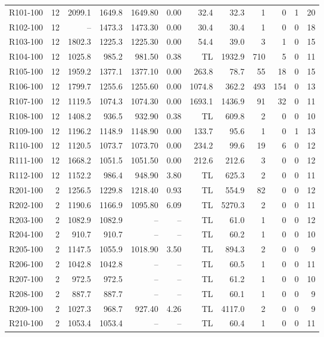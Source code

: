 \documentclass[10pt]{article}
\begin{document}
\begin{table}[p]
\begin{tabular}{lrrrrrrrrrrr}
\midrule
R101-100 & 12 & 2099.1 & 1649.8 & 1649.80 & 0.00 & 32.4 & 32.3 & 1 & 0 & 1 & 20 \\
R102-100 & 12 & -- & 1473.3 & 1473.30 & 0.00 & 30.4 & 30.4 & 1 & 0 & 0 & 18 \\
R103-100 & 12 & 1802.3 & 1225.3 & 1225.30 & 0.00 & 54.4 & 39.0 & 3 & 1 & 0 & 15 \\
R104-100 & 12 & 1025.8 & 985.2 & 981.50 & 0.38 & TL & 1932.9 & 710 & 5 & 0 & 11 \\
R105-100 & 12 & 1959.2 & 1377.1 & 1377.10 & 0.00 & 263.8 & 78.7 & 55 & 18 & 0 & 15 \\
R106-100 & 12 & 1799.7 & 1255.6 & 1255.60 & 0.00 & 1074.8 & 362.2 & 493 & 154 & 0 & 13 \\
R107-100 & 12 & 1119.5 & 1074.3 & 1074.30 & 0.00 & 1693.1 & 1436.9 & 91 & 32 & 0 & 11 \\
R108-100 & 12 & 1408.2 & 936.5 & 932.90 & 0.38 & TL & 609.8 & 2 & 0 & 0 & 10 \\
R109-100 & 12 & 1196.2 & 1148.9 & 1148.90 & 0.00 & 133.7 & 95.6 & 1 & 0 & 1 & 13 \\
R110-100 & 12 & 1120.5 & 1073.7 & 1073.70 & 0.00 & 234.2 & 99.6 & 19 & 6 & 0 & 12 \\
R111-100 & 12 & 1668.2 & 1051.5 & 1051.50 & 0.00 & 212.6 & 212.6 & 3 & 0 & 0 & 12 \\
R112-100 & 12 & 1152.2 & 986.4 & 948.90 & 3.80 & TL & 625.3 & 2 & 0 & 0 & 11 \\
\midrule
R201-100 & 2 & 1256.5 & 1229.8 & 1218.40 & 0.93 & TL & 554.9 & 82 & 0 & 0 & 12 \\
R202-100 & 2 & 1190.6 & 1166.9 & 1095.80 & 6.09 & TL & 5270.3 & 2 & 0 & 0 & 11 \\
R203-100 & 2 & 1082.9 & 1082.9 & -- & -- & TL & 61.0 & 1 & 0 & 0 & 12 \\
R204-100 & 2 & 910.7 & 910.7 & -- & -- & TL & 60.2 & 1 & 0 & 0 & 10 \\
R205-100 & 2 & 1147.5 & 1055.9 & 1018.90 & 3.50 & TL & 894.3 & 2 & 0 & 0 & 9 \\
R206-100 & 2 & 1042.8 & 1042.8 & -- & -- & TL & 60.5 & 1 & 0 & 0 & 11 \\
R207-100 & 2 & 972.5 & 972.5 & -- & -- & TL & 61.2 & 1 & 0 & 0 & 10 \\
R208-100 & 2 & 887.7 & 887.7 & -- & -- & TL & 60.1 & 1 & 0 & 0 & 9 \\
R209-100 & 2 & 1027.3 & 968.7 & 927.40 & 4.26 & TL & 4117.0 & 2 & 0 & 0 & 9 \\
R210-100 & 2 & 1053.4 & 1053.4 & -- & -- & TL & 60.4 & 1 & 0 & 0 & 11 \\

\end{tabular}
\end{table}
\end{document}

